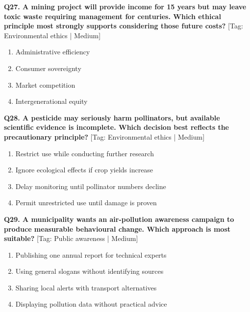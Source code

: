 \noindent\textbf{Q27. A mining project will provide income for 15 years but may leave toxic waste requiring management for centuries. Which ethical principle most strongly supports considering those future costs?} \hfill [Tag: Environmental ethics | Medium]
\begin{enumerate}[label=(\alph*),topsep=2pt,itemsep=1pt,partopsep=0pt,parsep=0pt]
    \item {Administrative efficiency}
    \item {Consumer sovereignty}
    \item {Market competition}
    \item {Intergenerational equity}
\end{enumerate}
\vspace{2mm}

\noindent\textbf{Q28. A pesticide may seriously harm pollinators, but available scientific evidence is incomplete. Which decision best reflects the precautionary principle?} \hfill [Tag: Environmental ethics | Medium]
\begin{enumerate}[label=(\alph*),topsep=2pt,itemsep=1pt,partopsep=0pt,parsep=0pt]
    \item {Restrict use while conducting further research}
    \item {Ignore ecological effects if crop yields increase}
    \item {Delay monitoring until pollinator numbers decline}
    \item {Permit unrestricted use until damage is proven}
\end{enumerate}
\vspace{2mm}

\noindent\textbf{Q29. A municipality wants an air-pollution awareness campaign to produce measurable behavioural change. Which approach is most suitable?} \hfill [Tag: Public awareness | Medium]
\begin{enumerate}[label=(\alph*),topsep=2pt,itemsep=1pt,partopsep=0pt,parsep=0pt]
    \item {Publishing one annual report for technical experts}
    \item {Using general slogans without identifying sources}
    \item {Sharing local alerts with transport alternatives}
    \item {Displaying pollution data without practical advice}
\end{enumerate}
\vspace{2mm}

